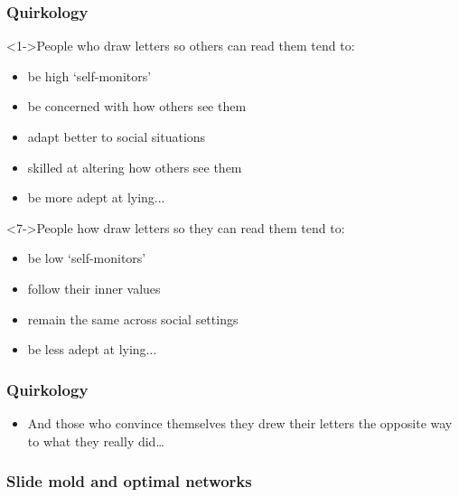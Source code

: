 \begin{frame}
  \frametitle{Quirkology}

  \begin{block}<1->{People who draw letters so others can read them tend to:}
    \begin{itemize}
    \item<2-> 
      be high `self-monitors'
    \item<3-> 
      be concerned with how others see them
    \item<4-> 
      adapt better to social situations
    \item<5-> 
      skilled at altering how others see them
    \item<6-> 
      be more adept at lying...
    \end{itemize}    
  \end{block}

  \begin{block}<7->{People how draw letters so they can read them tend to:}
    \begin{itemize}
    \item<8->
      be low `self-monitors'
    \item<9->
      follow their inner values
    \item<10->
      remain the same across social settings
    \item<11->
      be less adept at lying...
    \end{itemize}
  \end{block}

\end{frame}


\begin{frame}
  \frametitle{Quirkology}

  \begin{itemize}
  \item<1->
    And those who convince themselves
    they drew their letters the opposite way
    to what they really did\ldots

    \bigskip

  \end{itemize}

\end{frame}


\begin{frame}
  \frametitle{Slide mold and optimal networks}

\end{frame}

